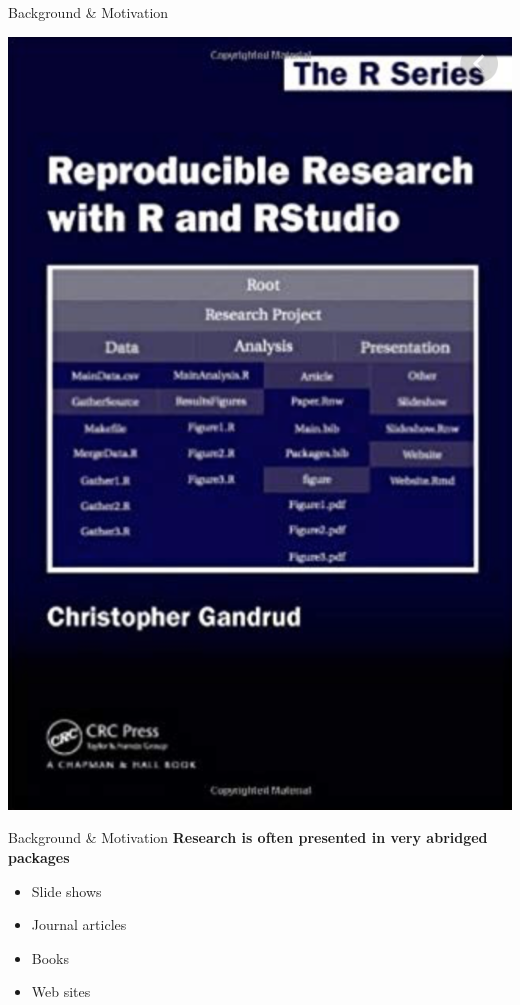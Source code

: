 \documentclass{beamer}\usepackage[]{graphicx}\usepackage[]{color}
\begin{document}
\begin{frame}{Background \& Motivation}
  \begin{center}
    \includegraphics[height=.85\textheight,keepaspectratio]{rr}
  \end{center}
\end{frame}

\begin{frame}[t]{Background \& Motivation}
  \textbf{Research is often presented in very abridged packages}
    \begin{itemize}
      \item Slide shows \vspace{1cm}
      \item Journal articles\vspace{1cm}
      \item Books \vspace{1cm}
      \item Web sites 
    \end{itemize} 
\end{frame}
\end{document}
